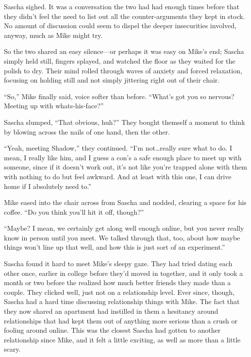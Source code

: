 Sascha sighed. It was a conversation the two had had enough times before that they didn't feel the need to list out all the counter-arguments they kept in stock. No amount of discussion could seem to dispel the deeper insecurities involved, anyway, much as Mike might try.

So the two shared an easy silence---or perhaps it was easy on Mike's end; Sascha simply held still, fingers splayed, and watched the floor as they waited for the polish to dry. Their mind rolled through waves of anxiety and forced relaxation, focusing on holding still and not simply jittering right out of their chair.

``So,'' Mike finally said, voice softer than before. ``What's got you so nervous? Meeting up with whats-his-face?''

Sascha slumped, ``That obvious, huh?'' They bought themself a moment to think by blowing across the nails of one hand, then the other.

``Yeah, meeting Shadow,'' they continued. ``I'm not\ldots{}really sure what to do. I mean, I really like him, and I guess a con's a safe enough place to meet up with someone, since if it doesn't work out, it's not like you're trapped alone with them with nothing to do but feel awkward. And at least with this one, I can drive home if I absolutely need to.''

Mike eased into the chair across from Sascha and nodded, clearing a space for his coffee. ``Do you think you'll hit it off, though?''

``Maybe? I mean, we certainly get along well enough online, but you never really know in person until you meet. We talked through that, too, about how maybe things won't line up that well, and how this is just sort of an experiment.''

Sascha found it hard to meet Mike's sleepy gaze. They had tried dating each other once, earlier in college before they'd moved in together, and it only took a month or two before the realized how much better friends they made than a couple. They clicked well, just not on a relationship level. Ever since, though, Sascha had a hard time discussing relationship things with Mike. The fact that they now shared an apartment had instilled in them a hesitancy around relationships that had kept them out of anything more serious than a crush or fooling around online. This was the closest Sascha had gotten to another relationship since Mike, and it felt a little exciting, as well as more than a little scary.

